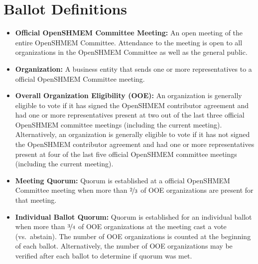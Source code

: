 \section{Ballot Definitions}

\begin{itemize}
\item {\bf Official OpenSHMEM Committee Meeting:} An open meeting of the entire
  OpenSHMEM Committee.  Attendance to the meeting is open to
  all organizations in the OpenSHMEM Committee as well as the general public.

\item {\bf Organization:} A business entity that sends one or more
  representatives to a official OpenSHMEM Committee meeting.

\item {\bf Overall Organization Eligibility (OOE):} An organization is
  generally eligible to vote if it
  has signed the OpenSHMEM contributor agreement and had one or more
  representatives present at two out of the last three
  official OpenSHMEM committee meetings (including the current meeting).
  Alternatively, an organization is generally eligible to vote if it has not
  signed the OpenSHMEM contributor agreement and had one or more
  representatives present at four of the last five official OpenSHMEM committee
  meetings (including the current meeting).

\item {\bf Meeting Quorum:} Quorum is established at a official OpenSHMEM
  Committee meeting when more than $\nicefrac{2}{3}$ of OOE organizations
  are present for that meeting.

\item {\bf Individual Ballot Quorum:} Quorum is established for an
  individual ballot when more than $\nicefrac{3}{4}$ of OOE
  organizations at the meeting cast a vote (vs.\ abstain).  The number
  of OOE organizations is counted at the beginning of each ballot.
  Alternatively, the number of OOE organizations may be verified after
  each ballot to determine if quorum was met.
\end{itemize}
